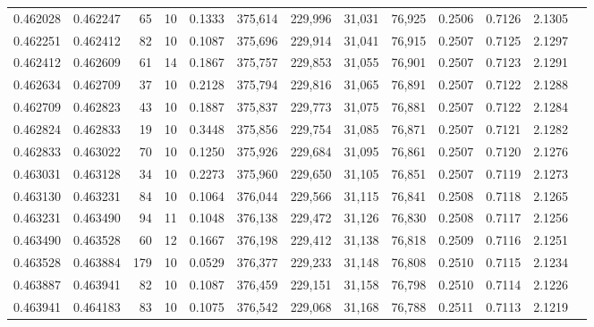 \begin{tabular}{rrrrrrrrrrrrr}
0.462028 & 0.462247 &    65 &  10 &                                     0.1333 & 375,614 & 229,996 &  31,031 &  76,925 & 0.2506 & 0.7126 & 2.1305 \\
0.462251 & 0.462412 &    82 &  10 &                                     0.1087 & 375,696 & 229,914 &  31,041 &  76,915 & 0.2507 & 0.7125 & 2.1297 \\
0.462412 & 0.462609 &    61 &  14 &                                     0.1867 & 375,757 & 229,853 &  31,055 &  76,901 & 0.2507 & 0.7123 & 2.1291 \\
0.462634 & 0.462709 &    37 &  10 &                                     0.2128 & 375,794 & 229,816 &  31,065 &  76,891 & 0.2507 & 0.7122 & 2.1288 \\
0.462709 & 0.462823 &    43 &  10 &                                     0.1887 & 375,837 & 229,773 &  31,075 &  76,881 & 0.2507 & 0.7122 & 2.1284 \\
0.462824 & 0.462833 &    19 &  10 &                                     0.3448 & 375,856 & 229,754 &  31,085 &  76,871 & 0.2507 & 0.7121 & 2.1282 \\
0.462833 & 0.463022 &    70 &  10 &                                     0.1250 & 375,926 & 229,684 &  31,095 &  76,861 & 0.2507 & 0.7120 & 2.1276 \\
0.463031 & 0.463128 &    34 &  10 &                                     0.2273 & 375,960 & 229,650 &  31,105 &  76,851 & 0.2507 & 0.7119 & 2.1273 \\
0.463130 & 0.463231 &    84 &  10 &                                     0.1064 & 376,044 & 229,566 &  31,115 &  76,841 & 0.2508 & 0.7118 & 2.1265 \\
0.463231 & 0.463490 &    94 &  11 &                                     0.1048 & 376,138 & 229,472 &  31,126 &  76,830 & 0.2508 & 0.7117 & 2.1256 \\
0.463490 & 0.463528 &    60 &  12 &                                     0.1667 & 376,198 & 229,412 &  31,138 &  76,818 & 0.2509 & 0.7116 & 2.1251 \\
0.463528 & 0.463884 &   179 &  10 &                                     0.0529 & 376,377 & 229,233 &  31,148 &  76,808 & 0.2510 & 0.7115 & 2.1234 \\
0.463887 & 0.463941 &    82 &  10 &                                     0.1087 & 376,459 & 229,151 &  31,158 &  76,798 & 0.2510 & 0.7114 & 2.1226 \\
0.463941 & 0.464183 &    83 &  10 &                                     0.1075 & 376,542 & 229,068 &  31,168 &  76,788 & 0.2511 & 0.7113 & 2.1219 \\

\end{tabular}
